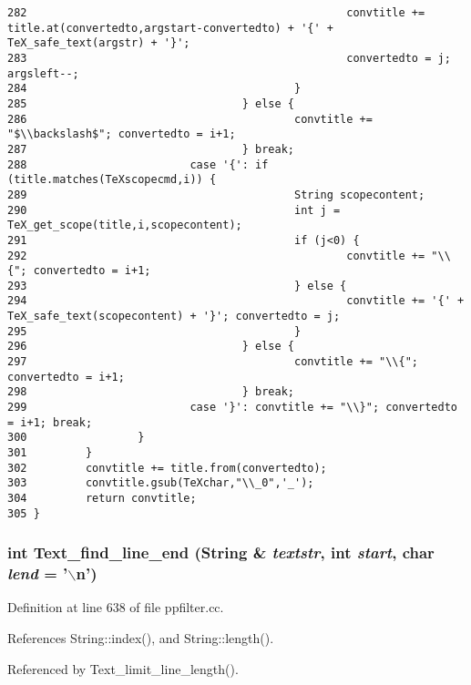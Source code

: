 \begin{verbatim}
282                                                 convtitle += title.at(convertedto,argstart-convertedto) + '{' + TeX_safe_text(argstr) + '}';
283                                                 convertedto = j; argsleft--;
284                                         }
285                                 } else {
286                                         convtitle += "$\\backslash$"; convertedto = i+1;
287                                 } break;
288                         case '{': if (title.matches(TeXscopecmd,i)) {
289                                         String scopecontent;
290                                         int j = TeX_get_scope(title,i,scopecontent);
291                                         if (j<0) {
292                                                 convtitle += "\\{"; convertedto = i+1;
293                                         } else {
294                                                 convtitle += '{' + TeX_safe_text(scopecontent) + '}'; convertedto = j;
295                                         }
296                                 } else {
297                                         convtitle += "\\{"; convertedto = i+1;
298                                 } break;
299                         case '}': convtitle += "\\}"; convertedto = i+1; break;
300                 }
301         }
302         convtitle += title.from(convertedto);
303         convtitle.gsub(TeXchar,"\\_0",'_');
304         return convtitle;
305 }
\end{verbatim}\normalsize 
{}
\subsubsection{\setlength{\rightskip}{0pt plus 5cm}int Text\_\-find\_\-line\_\-end ({\bf String} \& {\em textstr}, int {\em start}, char {\em lend} = '$\backslash$n')}\label{dil2al_8hh_a355}




Definition at line 638 of file ppfilter.cc.

References String::index(), and String::length().

Referenced by Text\_\-limit\_\-line\_\-length().



